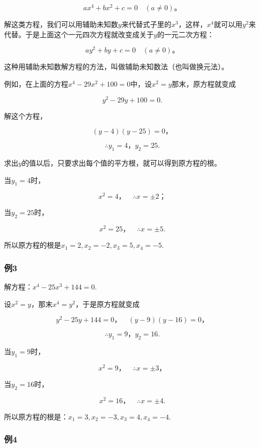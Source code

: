 \[
a x ^ {4} + b x ^ {2} + c = 0 \quad (a \neq 0)\text{。}
\]

解这类方程，我们可以用辅助未知数\(y\)来代替式子里的\(x^3\)，这样，\(x^4\)就可以用\(y^2\)来代替。于是上面这个一元四次方程就改变成关于\(y\)的一元二次方程：

\[
a y ^ {2} + b y + c = 0 \quad (a \neq 0)\text{。}
\]

这种用辅助未知数解方程的方法，叫做辅助未知数法（也叫做换元法）。

例如，在上面的方程\(x^{4} - 29x^{2} + 100 = 0\)中，设\(x^{2} = y\)那末，原方程就变成

\[
y ^ {2} - 29 y + 100 = 0.
\]

解这个方程，

\[
(y - 4) (y - 25) = 0\text{，}
\]

\[
\therefore y _ {1} = 4\text{，} y _ {2} = 25.
\]

求出\(y\)的值以后，只要求出每个值的平方根，就可以得到原方程的根。

当\(y_{1} = 4\)时，

\[
x ^ {2} = 4\text{，} \quad \therefore x = \pm 2\text{；}
\]

当\(y_{2} = 25\)时，

\[
x ^ {2} = 25\text{，} \quad \therefore x = \pm 5.
\]

所以原方程的根是\(x_{1} = 2, x_{2} = -2, x_{3} = 5, x_{4} = -5.\)

\subsubsection{例3}

解方程：\(x^4 -25x^3 +144 = 0.\)

 设\(x^{2} = y\)，那末\(x^{4} = y^{2}\)，于是原方程就变成

\[
y ^ {2} - 25 y + 144 = 0\text{，} \quad (y - 9) (y - 16) = 0\text{，}
\]

\[
\therefore y _ {1} = 9\text{，} y _ {2} = 16.
\]

当\(y_{1} = 9\)时，

\[
x ^ {2} = 9\text{，} \quad \therefore x = \pm 3\text{，}
\]

当\(y_{2} = 16\)时，

\[
x ^ {2} = 16\text{，} \quad \therefore x = \pm 4.
\]

所以原方程的根是：\(x_{1} = 3, x_{2} = -3, x_{3} = 4, x_{4} = -4.\)

\subsubsection{例4}

